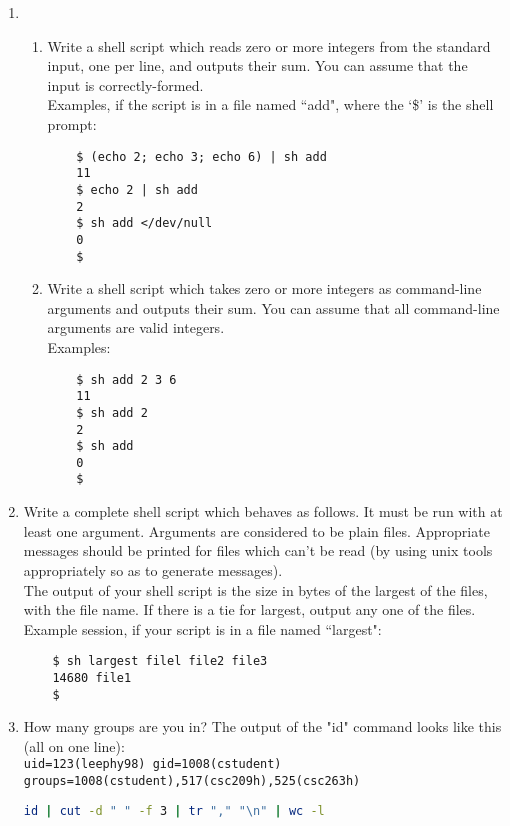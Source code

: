 \documentclass[11pt]{article}
\begin{document}
\begin{enumerate}
	\item 
		\begin{enumerate}
			\item Write a shell script which reads zero or more integers from the standard input, one per line, and outputs their sum. You can assume that the input is correctly-formed.\\
			Examples, if the script is in a file named ``add", where the `\$' is the shell prompt:\begin{Verbatim}
	$ (echo 2; echo 3; echo 6) | sh add
	11
	$ echo 2 | sh add
	2
	$ sh add </dev/null
	0
	$\end{Verbatim}
			
			
			\item Write a shell script which takes zero or more integers as command-line arguments and outputs their sum. You can assume that all command-line arguments are valid integers.\\
			Examples:\begin{Verbatim}
	$ sh add 2 3 6
	11
	$ sh add 2
	2
	$ sh add
	0
	$\end{Verbatim}
				
		\end{enumerate}
	
	\newpage
	\item Write a complete shell script which behaves as follows. It must be run with at least one argument. Arguments are considered to be plain files. Appropriate messages should be printed for files which can't be read (by using unix tools appropriately so as to generate messages).\\
	The output of your shell script is the size in bytes of the largest of the files, with the file name. If there is a tie for largest, output any one of the files.\\
	Example session, if your script is in a file named ``largest":
	\begin{Verbatim}
	$ sh largest filel file2 file3
	14680 file1
	$
	\end{Verbatim}
		
		
	\item How many groups are you in? The output of the "id" command looks like this (all on one line):\\
	\verb|uid=123(leephy98) gid=1008(cstudent) groups=1008(cstudent),517(csc209h),525(csc263h)|
		\begin{lstlisting}[language=sh]
	id | cut -d " " -f 3 | tr "," "\n" | wc -l\end{lstlisting}


\end{enumerate}
\end{document}
